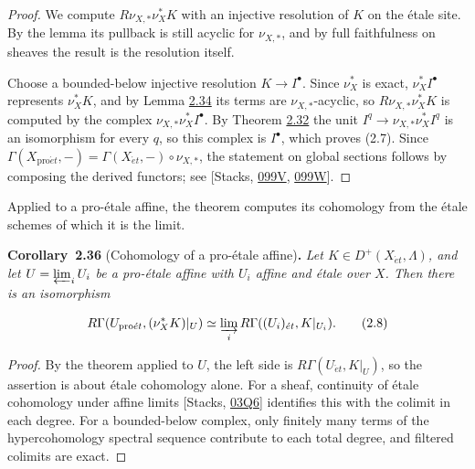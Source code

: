 \documentclass[11pt]{article}
\newenvironment{bpstatement}[2]{\par\addvspace{0.6\baselineskip}\noindent\textbf{#1}#2\textbf{.}\enspace\ignorespaces}
  {\par\addvspace{0.4\baselineskip}}
\newenvironment{bpstatementit}[2]{\begin{bpstatement}{#1}{#2}\itshape\ignorespaces}{\end{bpstatement}}
\begin{document}
\begin{proof}[{Proof}]\label{bp102}%
We compute \(R\nu_{X,*}\nu_X^*K\) with an injective resolution of \(K\) on the étale site. By the lemma its pullback is still acyclic for \(\nu_{X,*}\), and by full faithfulness on sheaves the result is the resolution itself.

Choose a bounded-below injective resolution \(K\to I^\bullet\). Since \(\nu_X^*\) is exact, \(\nu_X^*I^\bullet\) represents \(\nu_X^*K\), and by Lemma \hyperref[bp98]{2.34} its terms are \(\nu_{X,*}\)-acyclic, so \(R\nu_{X,*}\nu_X^*K\) is computed by the complex \(\nu_{X,*}\nu_X^*I^\bullet\). By Theorem \hyperref[bp93]{2.32} the unit \(I^q\to\nu_{X,*}\nu_X^*I^q\) is an isomorphism for every \(q\), so this complex is \(I^\bullet\), which proves (2.7). Since \(\Gamma(X_{\mathrm{pro}\acute{e}t},-)=\Gamma(X_{\acute{e}t},-)\circ\nu_{X,*}\), the statement on global sections follows by composing the derived functors; see [Stacks, \href{https://stacks.math.columbia.edu/tag/099V}{099V}, \href{https://stacks.math.columbia.edu/tag/099W}{099W}].
\end{proof}

\label{bp103}%
Applied to a pro-étale affine, the theorem computes its cohomology from the étale schemes of which it is the limit.

\label{bp104}%
\begin{bpstatementit}{Corollary~2.36}{ (Cohomology of a pro-étale affine)}
Let \(K\in D^+(X_{\acute{e}t},\Lambda)\), and let \(U=\varprojlim_iU_i\) be a pro-étale affine with \(U_i\) affine and étale over \(X\). Then there is an isomorphism

\[
R\Gamma(U_{\mathrm{pro}\acute{e}t},(\nu_X^*K)|_U)
\simeq \varinjlim_i R\Gamma((U_i)_{\acute{e}t},K|_{U_i}).
\tag{2.8}
\]
\end{bpstatementit}

\begin{proof}[{Proof}]\label{bp105}%
By the theorem applied to \(U\), the left side is \(R\Gamma(U_{\acute{e}t},K|_U)\), so the assertion is about étale cohomology alone. For a sheaf, continuity of étale cohomology under affine limits [Stacks, \href{https://stacks.math.columbia.edu/tag/03Q6}{03Q6}] identifies this with the colimit in each degree. For a bounded-below complex, only finitely many terms of the hypercohomology spectral sequence contribute to each total degree, and filtered colimits are exact.
\end{proof}
\end{document}
